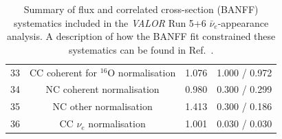 {\begin{table}
\begin{tabular}{| c | c | c | c |}
           33 &  CC coherent for $^{16}$O normalisation                          & 1.076   & 1.000 / 0.972 \\ 
           34 &  NC coherent normalisation                                       & 0.980   & 0.300 / 0.299 \\ 
           35 &  NC other normalisation                                          & 1.413   & 0.300 / 0.186 \\ 
           36 &  CC $\nu_{e}$ normalisation                                      & 1.001   & 0.030 / 0.030 \\ 
\hline
\end{tabular}
\caption{
 Summary of flux and correlated cross-section (BANFF) systematics included in the {\em VALOR} Run 5+6 
 $\bar{\nu}_{e}$-appearance analysis.
 A description of how the BANFF fit constrained these systematics can be found in Ref.~\cite{BANFF2015}.
}
\label{tab:banff_uncertainties}
\end{table}
}

\clearpage
